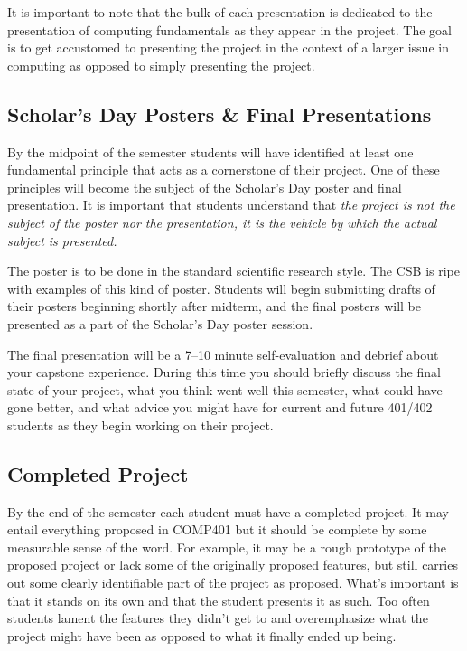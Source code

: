 \documentclass[nobib]{tufte-handout}
\begin{document}
It is important to note that the bulk of each presentation is dedicated to the presentation of computing fundamentals as they appear in the project. The goal is to get accustomed to presenting the project in the context of a larger issue in computing as opposed to simply presenting the project.

\subsection{Scholar's Day Posters \& Final Presentations}

By the midpoint of the semester students will have identified at least one fundamental principle that acts as a cornerstone of their project. One of these principles will become the subject of the Scholar's Day poster and final presentation. It is important that students understand that \textit{the project is not the subject of the poster nor the presentation, it is the vehicle by which the actual subject is presented.}

The poster is to be done in the standard scientific research style. The CSB is ripe with examples of this kind of poster. Students will begin submitting drafts of their posters beginning shortly after midterm, and the final posters will be presented as a part of the Scholar's Day poster session.

The final presentation will be a 7--10 minute self-evaluation and debrief about your capstone experience. During this time you should briefly discuss the final state of your project, what you think went well this semester, what could have gone better, and what advice you might have for current and future 401/402 students as they begin working on their project.

\subsection{Completed Project}

By the end of the semester each student must have a completed project. It may entail everything proposed in COMP401 but it should be complete by some measurable sense of the word. For example, it may be a rough prototype of the proposed project or lack some of the originally proposed features, but still carries out some clearly identifiable part of the project as proposed. What's important is that it stands on its own and that the student presents it as such. Too often students lament the features they didn't get to and overemphasize what the project might have been as opposed to what it finally ended up being.
\end{document}
